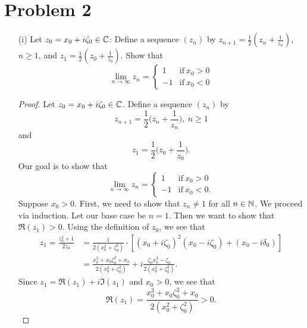 \documentclass[a4paper]{article}
\begin{document}
\section*{Problem 2}
\begin{enumerate}
    \item[(i)] Let \( {z}_{0} = {x}_{0} + i {\zeta}_{0} \in \mathbb{C}  \): Define a sequence \( ({z}_{n}) \) by \( {z}_{n+1} = \frac{ 1 }{ 2 }  ({z}_{n} + \frac{ 1 }{ {z}_{n} } ) \), \( n \geq 1  \), and \( {z}_{1} = \frac{ 1 }{ 2 }  ({z}_{0} + \frac{ 1 }{ {z}_{0} } ) \). 
        Show that 
        \[  \lim_{ n  \to \infty  } {z}_{n} = 
        \begin{cases}
            1 &\text{if} \ {x}_{0} > 0 \\
            -1 &\text{if}  \ {x}_{0} < 0 
        \end{cases}   \]
    \begin{proof}
     Let \( {z}_{0} = {x}_{0} + i {\zeta}_{0} \in \mathbb{C}  \). Define a sequence \( ({z}_{n}) \) by     
     \[  {z}_{n+1} = \frac{ 1 }{ 2 }  \Big(  {z}_{n} + \frac{ 1 }{ {z}_{n} }  \Big), \ n \geq 1  \]
     and
     \[  {z}_{1} = \frac{ 1 }{ 2 } \Big(  {z}_{0} + \frac{ 1 }{ {z}_{0} }  \Big). \]
     Our goal is to show that 
        \[  \lim_{ n  \to \infty  } {z}_{n} = 
        \begin{cases}
            1 &\text{if} \ {x}_{0} > 0 \\
            -1 &\text{if}  \ {x}_{0} < 0. 
        \end{cases}   \]
        Suppose \( {x}_{0} > 0  \). First, we need to show that \( {z}_{n} \neq 1  \) for all \( n \in \mathbb{N}  \). We proceed via induction. Let our base case be \( n = 1  \). Then we want to show that \( \Re({z}_{1}) > 0  \). Using the definition of \( {z}_{0} \), we see that  
        \begin{align*}
            {z}_{1} = \frac{ {z}_{0}^{2} + 1  }{ 2 {z}_{0} } &= \frac{ 1 }{ 2({x}_{0}^{2} + {\zeta}_{0}^{2}) } \cdot [({x}_{0} + i {\zeta}_{0})^{2}({x}_{0} - i {\zeta}_{0}) + ({x}_{0} - i {\delta}_{0}) ] \\
                                                             &= \frac{ {x}_{0}^{3} + {x}_{0} {\zeta}_{0}^{2} + {x}_{0} }{ 2 ({x}_{0}^{2} + {\zeta}_{0}^{2}) } +  i \frac{ {\zeta}_{0} {x}_{0}^{3} - {\zeta}_{0} }{ 2 ({x}_{0}^{2} + {\zeta}_{0}^{2}) }.
        \end{align*}
        Since \( {z}_{1} = \Re({z}_{1}) + i \Im({z}_{1}) \) and \( {x}_{0} > 0  \), we see that 
        \[  \Re({z}_{1}) = \frac{ {x}_{0}^{3} + {x}_{0} {\zeta}_{0}^{2} + {x}_{0} }{ 2 ({x}_{0}^{2} + {\zeta}_{0}^{2})  } > 0.   \]

\end{proof}
\end{enumerate}
\end{document}
